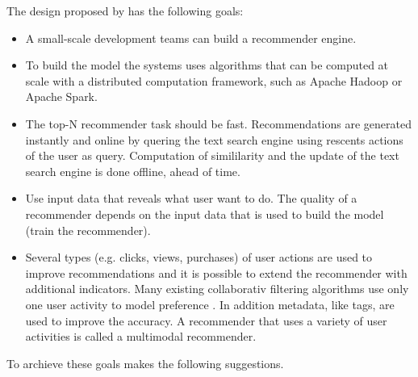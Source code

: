 The design proposed by \cite{Dunning14} has the following goals:
\begin{itemize}
\item A small-scale development teams can build a recommender engine.
\item To build the model the systems uses algorithms that can be computed at scale with a distributed computation framework, such as Apache Hadoop or Apache Spark. 
\item The top-N recommender task should be fast. Recommendations are generated instantly and online by quering the text search engine using rescents actions of the user as query. Computation of simililarity and the update of the text search engine is done offline, ahead of time.
\item Use input data that reveals what user want to do. The quality of a recommender depends on the input data that is used to build the model (train the recommender). 
\item Several types (e.g. clicks, views, purchases) of user actions are used to improve recommendations and it is possible to extend the recommender with additional \glspl{indicator}. Many existing collaborativ filtering algorithms use only one user activity to model preference \cite{ferrel}. In addition metadata, like \glspl{tag}, are used to improve the accuracy. A recommender that uses a variety of user activities is called a \gls{multimodal} recommender. 
\end{itemize}

To archieve these goals \cite{Dunning14} makes the following suggestions.

